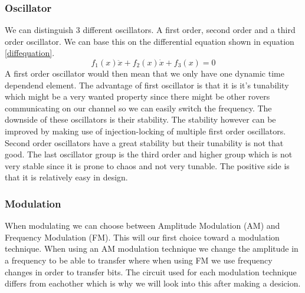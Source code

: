 \documentclass[10pt,a4paper]{article}
\begin{document}
\subsubsection{Oscillator}
We can distinguish 3 different oscillators. A first order, second order and a third order oscillator. We can base this on the differential equation shown in equation \ref{diffequation}.
\begin{equation}
\label{diffequation}
f_1(x)\ddot{x} + f_2(x)\dot{x} + f_3(x) = 0
\end{equation}
A first order oscillator would then mean that we only have one dynamic time dependend element. The advantage of first oscillator is that it is it's tunability which might be a very wanted property since there might be other rovers communicating on our channel so we can easily switch the frequency. The downside of these oscillators is their stability. The stability however can be improved by making use of injection-locking of multiple first order oscillators. Second order oscillators have a great stability but their tunability is not that good. The last oscillator group is the third order and higher group which is not very stable since it is prone to chaos and not very tunable. The positive side is that it is relatively easy in design.

\subsubsection{Modulation}
When modulating we can choose between Amplitude Modulation (AM) and Frequency Modulation (FM). This will our first choice toward a modulation technique. When using an AM modulation technique we change the amplitude in a frequency to be able to transfer where when using FM we use frequency changes in order to transfer bits. The circuit used for each modulation technique differs from eachother which is why we will look into this after making a desicion. 
\end{document}
